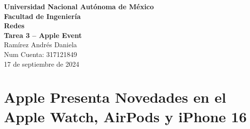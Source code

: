 \documentclass[letterpaper,12pt]{article}
\begin{document}
	
	\noindent
	\textbf{\small Universidad Nacional Autónoma de México}\\
	\textbf{\small Facultad de Ingeniería}\\
	\textbf{\small Redes}\\
	\textbf{\small Tarea 3 – Apple Event}\\
	\small Ramírez Andrés Daniela \\
	\small Num Cuenta: 317121849 \\
	\small 17 de septiembre de 2024 \\
	
	\vspace{0.000001cm} %
	
	\section{\small Apple Presenta Novedades en el Apple Watch, AirPods y iPhone 16}
	
\end{document}
